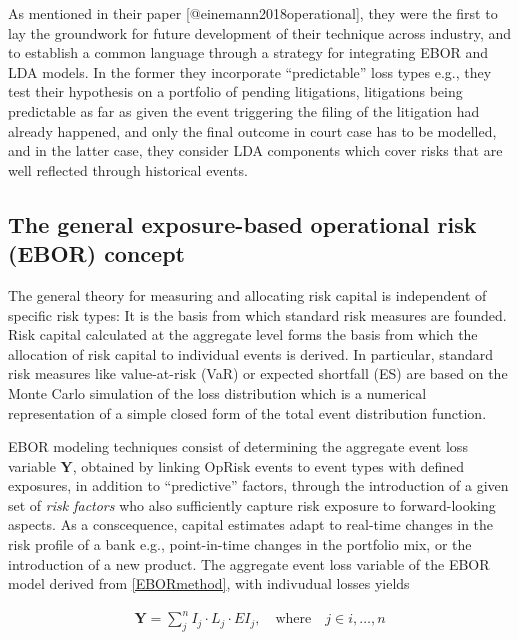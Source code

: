 \documentclass[]{article}
\begin{document}
As mentioned in their paper {[}@einemann2018operational{]}, they were
the first to lay the groundwork for future development of their
technique across industry, and to establish a common language through a
strategy for integrating EBOR and LDA models. In the former they
incorporate ``predictable'' loss types e.g., they test their hypothesis
on a portfolio of pending litigations, litigations being predictable as
far as given the event triggering the filing of the litigation had
already happened, and only the final outcome in court case has to be
modelled, and in the latter case, they consider LDA components which
cover risks that are well reflected through historical events.

\subsection{The general exposure-based operational risk (EBOR) concept}
\label{ssec:The general exposure-based operational risk (EBOR) concept}

The general theory for measuring and allocating risk capital is
independent of specific risk types: It is the basis from which standard
risk measures are founded. Risk capital calculated at the aggregate
level forms the basis from which the allocation of risk capital to
individual events is derived. In particular, standard risk measures like
value-at-risk (VaR) or expected shortfall (ES) are based on the Monte
Carlo simulation of the loss distribution which is a numerical
representation of a simple closed form of the total event distribution
function.\medskip

EBOR modeling techniques consist of determining the aggregate event loss
variable \(\mathbf{Y}\), obtained by linking OpRisk events to event
types with defined exposures, in addition to ``predictive'' factors,
through the introduction of a given set of \emph{risk factors} who also
sufficiently capture risk exposure to forward-looking aspects. As a
conscequence, capital estimates adapt to real-time changes in the risk
profile of a bank e.g., point-in-time changes in the portfolio mix, or
the introduction of a new product. The aggregate event loss variable of
the EBOR model derived from \ref{EBORmethod}, with indivudual losses
yields

\singlespacing

\begin{eqnarray}\label{EBORmodel}
\mathbf{Y} =\sum_j^n I_j\cdot L_j\cdot EI_j, \quad \mbox{where}\quad j \in {i,\ldots,n}
\end{eqnarray} \doublespacing \medskip
\end{document}
